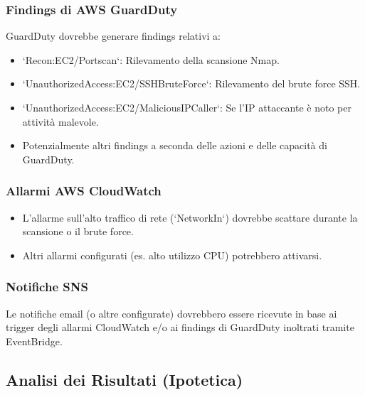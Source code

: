 \subsubsection{Findings di AWS GuardDuty}
\label{subsubsec:guardduty_findings_test}
GuardDuty dovrebbe generare findings relativi a:
\begin{itemize}
    \item `Recon:EC2/Portscan`: Rilevamento della scansione Nmap.
    \item `UnauthorizedAccess:EC2/SSHBruteForce`: Rilevamento del brute force SSH.
    \item `UnauthorizedAccess:EC2/MaliciousIPCaller`: Se l'IP attaccante è noto per attività malevole.
    \item Potenzialmente altri findings a seconda delle azioni e delle capacità di GuardDuty.
\end{itemize}

\subsubsection{Allarmi AWS CloudWatch}
\label{subsubsec:cloudwatch_alarms_test}
\begin{itemize}
    \item L'allarme sull'alto traffico di rete (`NetworkIn`) dovrebbe scattare durante la scansione o il brute force.
    \item Altri allarmi configurati (es. alto utilizzo CPU) potrebbero attivarsi.
\end{itemize}

\subsubsection{Notifiche SNS}
\label{subsubsec:sns_notifications_test}
Le notifiche email (o altre configurate) dovrebbero essere ricevute in base ai trigger degli allarmi CloudWatch e/o ai findings di GuardDuty inoltrati tramite EventBridge.

\subsection{Analisi dei Risultati (Ipotetica)}
\label{subsec:analisi_risultati_test}

